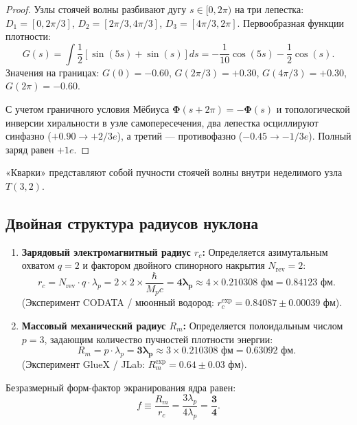 \documentclass[12pt,a4paper]{article}
\begin{document}
	\begin{proof}
		Узлы стоячей волны разбивают дугу $s \in [0, 2\pi)$ на три лепестка: $D_1 = [0, 2\pi/3]$, $D_2 = [2\pi/3, 4\pi/3]$, $D_3 = [4\pi/3, 2\pi]$. Первообразная функции плотности:
		\begin{equation}
			G(s) = \int \frac{1}{2} [\sin(5s) + \sin(s)] ds = -\frac{1}{10}\cos(5s) - \frac{1}{2}\cos(s).
		\end{equation}
		Значения на границах: $G(0) = -0.60$, $G(2\pi/3) = +0.30$, $G(4\pi/3) = +0.30$, $G(2\pi) = -0.60$.
		
		С учетом граничного условия Мёбиуса $\boldsymbol{\Phi}(s+2\pi) = -\boldsymbol{\Phi}(s)$ и топологической инверсии хиральности в узле самопересечения, два лепестка осциллируют синфазно ($+0.90 \to +2/3e$), а третий --- противофазно ($-0.45 \to -1/3e$). Полный заряд равен $+1e$.
	\end{proof}
	«Кварки» представляют собой пучности стоячей волны внутри неделимого узла $T(3,2)$.
	
	\subsection{Двойная структура радиусов нуклона}
	\begin{enumerate}
		\item \textbf{Зарядовый электромагнитный радиус $r_c$:} Определяется азимутальным охватом $q=2$ и фактором двойного спинорного накрытия $N_{\text{rev}} = 2$:
		\begin{equation}
			r_c = N_{\text{rev}} \cdot q \cdot \lambda_p = 2 \times 2 \times \frac{\hbar}{M_p c} = \mathbf{4 \lambda_p} \approx 4 \times 0.210308 \text{ фм} = \mathbf{0.84123 \text{ фм}}.
		\end{equation}
		(Эксперимент CODATA / мюонный водород: $r_c^{\text{exp}} = 0.84087 \pm 0.00039$ фм).
		
		\item \textbf{Массовый механический радиус $R_m$:} Определяется полоидальным числом $p=3$, задающим количество пучностей плотности энергии:
		\begin{equation}
			R_m = p \cdot \lambda_p = \mathbf{3 \lambda_p} \approx 3 \times 0.210308 \text{ фм} = \mathbf{0.63092 \text{ фм}}.
		\end{equation}
		(Эксперимент GlueX / JLab: $R_m^{\text{exp}} = 0.64 \pm 0.03$ фм).
	\end{enumerate}
	Безразмерный форм-фактор экранирования ядра равен:
	\begin{equation}
		f \equiv \frac{R_m}{r_c} = \frac{3 \lambda_p}{4 \lambda_p} = \mathbf{\frac{3}{4}}.
	\end{equation}
	
\end{document}
